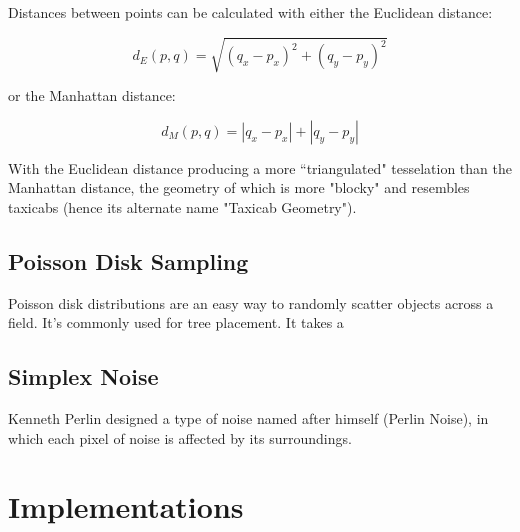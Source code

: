 Distances between points can be calculated with either the Euclidean distance:

$$ d_{E}(p, q) = \sqrt{(q_x - p_x)^2 + (q_y - p_y)^2} $$

or the Manhattan distance:

$$ d_{M}(p, q) = |q_x - p_x| + |q_y - p_y| $$

With the Euclidean distance producing a more ``triangulated" tesselation than the Manhattan distance, the geometry of which is more "blocky" and resembles taxicabs (hence its alternate name "Taxicab Geometry").

\subsection{Poisson Disk Sampling}

Poisson disk distributions are an easy way to randomly scatter objects across a field. It's commonly used for tree placement. It takes a 

\subsection{Simplex Noise}

Kenneth Perlin designed a type of noise named after himself (Perlin Noise), in which each pixel of noise is affected by its surroundings. 

\section{Implementations}